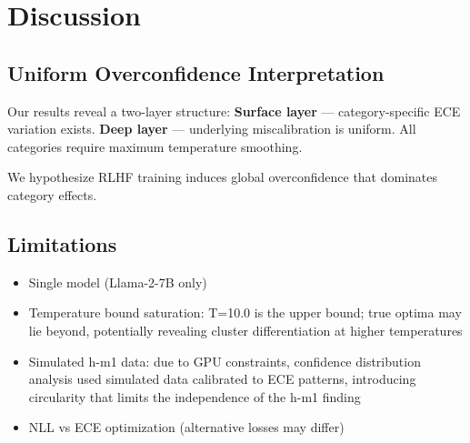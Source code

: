\section{Discussion}

\subsection{Uniform Overconfidence Interpretation}

Our results reveal a two-layer structure: \textbf{Surface layer} --- category-specific ECE variation exists. \textbf{Deep layer} --- underlying miscalibration is uniform. All categories require maximum temperature smoothing.

We hypothesize RLHF training induces global overconfidence that dominates category effects.

\subsection{Limitations}

\begin{itemize}
    \item Single model (Llama-2-7B only)
    \item Temperature bound saturation: T=10.0 is the upper bound; true optima may lie beyond, potentially revealing cluster differentiation at higher temperatures
    \item Simulated h-m1 data: due to GPU constraints, confidence distribution analysis used simulated data calibrated to ECE patterns, introducing circularity that limits the independence of the h-m1 finding
    \item NLL vs ECE optimization (alternative losses may differ)
\end{itemize}
